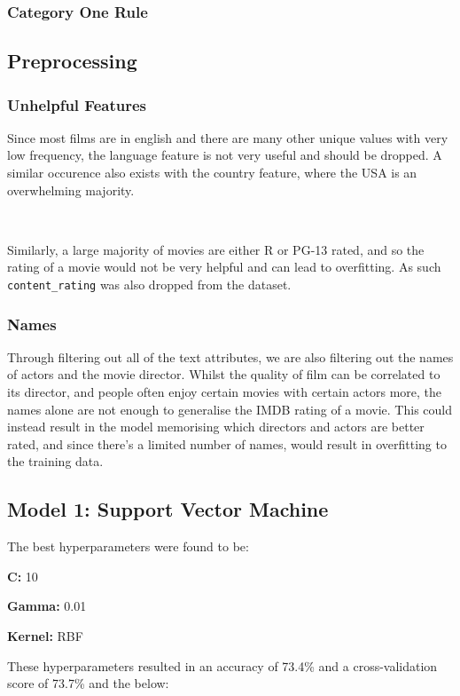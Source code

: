 \documentclass[11pt]{article}
\begin{document}
\subsubsection{Category One Rule}



\subsection{Preprocessing}

\subsubsection{Unhelpful Features}
Since most films are in english and there are many other unique values with very low frequency, the language feature is not very useful and should be dropped. A similar occurence also exists with the country feature, where the USA is an overwhelming majority. 

\ 

\noindent
Similarly, a large majority of movies are either R or PG-13 rated, and so the rating of a movie would not be very helpful and can lead to overfitting. As such \texttt{content\_rating} was also dropped from the dataset.

\subsubsection{Names}
Through filtering out all of the text attributes, we are also filtering out the names of actors and the movie director. Whilst the quality of film can be correlated to its director, and people often enjoy certain movies with certain actors more, the names alone are not enough to generalise the IMDB rating of a movie. This could instead result in the model memorising which directors and actors are better rated, and since there's a limited number of names, would result in overfitting to the training data.


\subsection{Model 1: Support Vector Machine}
The best hyperparameters were found to be:

\textbf{C: } 10

\textbf{Gamma: } 0.01

\textbf{Kernel: } RBF

\noindent
These hyperparameters resulted in an accuracy of 73.4\% and a cross-validation score of 73.7\% and the below:
\end{document}

